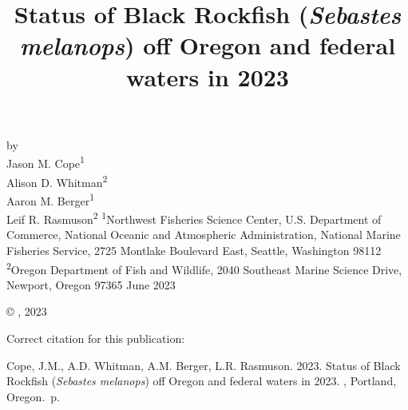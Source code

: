 \documentclass[11pt,
  english,
  letterpaper,
]{article}
\date{}
\newcommand{\trTitle}{Status of Black Rockfish (\emph{Sebastes melanops}) off Oregon and federal waters in 2023}
\newcommand{\trYear}{2023}
\newcommand{\trMonth}{June}
\newcommand{\trAuthsBack}{Cope, J.M., A.D. Whitman, A.M. Berger, L.R. Rasmuson}
\newcommand{\trCitation}{
\begin{hangparas}{1em}{1}
\trAuthsBack{}. \trYear{}. \trTitle{}. \glsentrylong{pfmc}, Portland, Oregon. \pageref{LastPage}{}\,p.
\end{hangparas}}
\begin{document}

\renewcommand*{\thefootnote}{\fnsymbol{footnote}}

\small
\thispagestyle{empty}
\noindent
\begin{center}
\title{Status of Black Rockfish (\emph{Sebastes melanops}) off Oregon and federal waters in 2023}
\vspace{1.5cm}
{\Large\textbf{}}
\vfill
by\\
Jason M. Cope\textsuperscript{1}\\
Alison D. Whitman\textsuperscript{2}\\
Aaron M. Berger\textsuperscript{1}\\
Leif R. Rasmuson\textsuperscript{2}\vfill
\textsuperscript{1}Northwest Fisheries Science Center, U.S. Department of Commerce, National Oceanic and Atmospheric Administration, National Marine Fisheries Service, 2725 Montlake Boulevard East, Seattle, Washington 98112\\
\textsuperscript{2}Oregon Department of Fish and Wildlife, 2040 Southeast Marine Science Drive, Newport, Oregon 97365\vfill
\trMonth{} \trYear{}
\end{center}
\clearpage

\thispagestyle{empty}
\vspace*{\fill}
\begin{center}
\copyright{} , \trYear{}\\
\end{center}
\par
\bigskip
\noindent
Correct citation for this publication:
\bigskip
\par
\trCitation{}
\clearpage


\tableofcontents\clearpage
\label{TRlastRoman}
\clearpage

\newpage
\thispagestyle{empty} %

\pagestyle{plain}  %
\renewcommand*{\thefootnote}{\arabic{footnote}}  %
\setcounter{footnote}{0}  %
\renewcommand{\headrulewidth}{0.5pt}
\renewcommand{\footrulewidth}{0.5pt}
\end{document}
